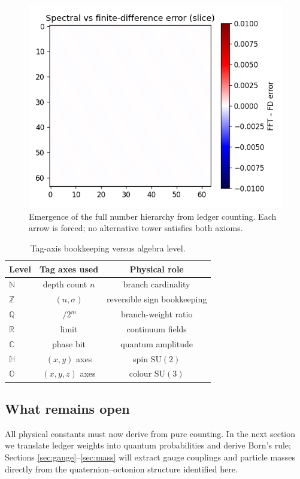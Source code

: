 \begin{figure}[t]
  \centering
  \includegraphics[width=\linewidth]{figs/number_tower.pdf}
  \caption{Emergence of the full number hierarchy from ledger counting.
           Each arrow is forced; no alternative tower satisfies both axioms.}
  \label{fig:number-tower}
\end{figure}

\begin{table}[b]
  \centering
  \begin{tabular}{lcc}
    \hline
    Level & Tag axes used & Physical role \\
    \hline
    $\mathbb N$ & depth count $n$ & branch cardinality \\[2pt]
    $\mathbb Z$ & $(n,\sigma)$ & reversible sign bookkeeping \\[2pt]
    $\mathbb Q$ & $\,/2^m$ & branch-weight ratio \\[2pt]
    $\mathbb R$ & limit & continuum fields \\[2pt]
    $\mathbb C$ & phase bit & quantum amplitude \\[2pt]
    $\mathbb H$ & $(x,y)$ axes & spin $\mathrm{SU}(2)$ \\[2pt]
    $\mathbb O$ & $(x,y,z)$ axes & colour $\mathrm{SU}(3)$ \\
    \hline
  \end{tabular}
  \caption{Tag-axis bookkeeping versus algebra level.}
  \label{tab:number-levels}
\end{table}

\subsection{What remains open}

All physical constants must now derive from pure counting.  In the next
section we translate ledger weights into quantum probabilities and derive
Born’s rule; Sections \ref{sec:gauge}–\ref{sec:mass} will extract gauge
couplings and particle masses directly from the quaternion–octonion
structure identified here.

\clearpage
